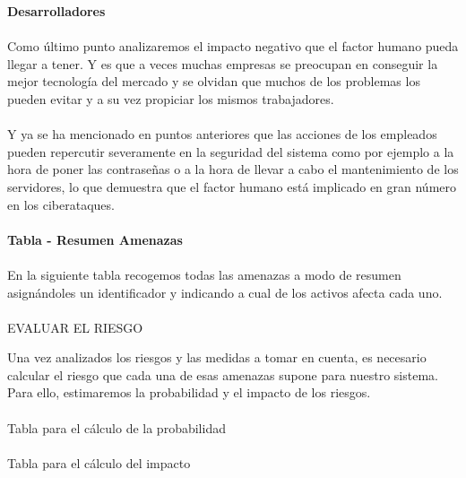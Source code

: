 \textbf{Desarrolladores}
\paragraph{}
Como último punto analizaremos el impacto negativo que el factor humano pueda llegar a tener. Y es que a veces muchas empresas se preocupan en conseguir la mejor tecnología del mercado y se olvidan que muchos de los problemas los pueden evitar y a su vez propiciar los mismos trabajadores.
\paragraph{}
Y ya se ha mencionado en puntos anteriores que las acciones de los empleados pueden repercutir severamente en la seguridad del sistema como por ejemplo a la hora de poner las contraseñas o a la hora de llevar a cabo el mantenimiento de los servidores, lo que demuestra que el factor humano está implicado en gran número en los ciberataques.

\paragraph{}
\textbf{Tabla - Resumen Amenazas}
\paragraph{}
En la siguiente tabla recogemos todas las amenazas a modo de resumen asignándoles un identificador y indicando a cual de los activos afecta cada uno.



\paragraph{}
EVALUAR EL RIESGO

Una vez analizados los riesgos y las medidas a tomar en cuenta, es necesario calcular el riesgo que cada una de esas amenazas supone para nuestro sistema. Para ello, estimaremos la probabilidad y el impacto de los riesgos.
\paragraph{}
Tabla para el cálculo de la probabilidad
\paragraph{}
Tabla para el cálculo del impacto
